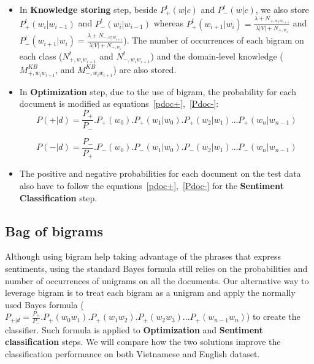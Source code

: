 \begin{itemize}
	
\item In \textbf{Knowledge storing} step, beside $P^t_+(w|c)$ and $P^t_-(w|c)$, we also store $P^t_+(w_i|w_{i-1})$ and $P^t_-(w_i|w_{i-1})$ whereas $P^t_+(w_{i+1}|w_i) = \frac{\lambda + N_{+,w_iw_{i+1}}}{\lambda|V|+N_{+,w_i}}$ and $P^t_-(w_{i+1}|w_i)= \frac{\lambda + N_{-,w_iw_{i+1}}}{\lambda|V|+N_{-,w_i}}$). 
The number of occurrences of each bigram on each class ($N^t_{+,w_iw_{i+1}}$ and $N^t_{-,w_iw_{i+1}}$) and the domain-level knowledge  ($M^{KB}_{+,w_iw_{i+1}}$, and  $M^{KB}_{-,w_iw_{i+1}}$) are also stored. 
			
\item In \textbf{Optimization} step, due to the use of bigram, the probability for each document is modified as equations~\ref{pdoc+},~\ref{Pdoc-}:
\begin{equation}
P(+|d) = \frac{P_+}{P_-}.P_+(w_0).P_+(w_1|w_0).P_+(w_2|w_1)…P_+(w_n|w_{n-1}) 
\label{pdoc+}
\end{equation}

\begin{equation}
P(-|d) = \frac{P_-}{P_+}.P_-(w_0).P_-(w_1|w_0).P_-(w_2|w_1)…P_-(w_n|w_{n-1}) 
\label{Pdoc-}
\end{equation}

\item The positive and negative probabilities for each document on the test data also have to follow the equations~\ref{pdoc+},~\ref{Pdoc-} for the \textbf{Sentiment Classification} step.

\end{itemize}

\subsection{Bag of bigrams} %
Although using bigram help taking advantage of the phrases that express sentiments, using the standard Bayes formula still relies on the probabilities and number of occurrences of unigrams on all the documents.
Our alternative way to leverage bigram is to treat each bigram as a unigram and apply the normally used Bayes formula ( $P_{+|d} = \frac{P_+}{P_-}.P_+(w_0w_1).P_+(w_1w_2).P_+(w_2w_3)…P_+(w_{n-1}w_n) $) to create the classifier.
Such formula is applied to \textbf{Optimization} and \textbf{Sentiment classification} steps. 
We will compare how the two solutions improve the classification performance on both Vietnamese and English dataset.

